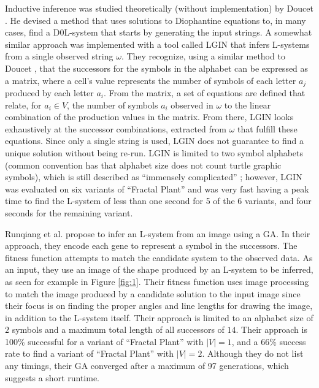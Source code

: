 \documentclass{llncs}
\begin{document}
	Inductive inference was studied theoretically (without implementation) by Doucet \cite{doucet_algebra}. He devised a method that uses solutions to Diophantine equations to, in many cases, find a D0L-system that starts by generating the input strings. A somewhat similar approach was implemented with a tool called LGIN \cite{nakano_inferD0Lerrorfree} that infers L-systems from a single observed string $\omega$. They recognize, using a similar method to Doucet \cite{doucet_algebra}, that the successors for the symbols in the alphabet can be expressed as a matrix, where a cell's value represents the number of symbols of each letter $a_{j}$ produced by each letter $a_{i}$. From the matrix, a set of equations are defined that relate, for $a_{i} \in V$, the number of symbols $a_{i}$ observed in $\omega$ to the linear combination of the production values in the matrix. From there, LGIN looks exhaustively at the successor combinations, extracted from $\omega$ that fulfill these equations. Since only a single string is used, LGIN does not guarantee to find a unique solution without being re-run. LGIN is limited to two symbol alphabets (common convention has that alphabet size does not count turtle graphic symbols), which is still described as ``immensely complicated'' \cite{nakano_inferD0Lerrorfree}; however, LGIN was evaluated on six variants of ``Fractal Plant'' \cite{beauty} and was very fast having a peak time to find the L-system of less than one second for 5 of the 6 variants, and four seconds for the remaining variant.
	
	Runqiang et al. \cite{runqiang_inferGA} propose to infer an L-system from an image using a GA. In their approach, they encode each gene to represent a symbol in the successors. The fitness function attempts to match the candidate system to the observed data. As an input, they use an image of the shape produced by an L-system to be inferred, as seen for example in Figure \ref{fig:1}. Their fitness function uses image processing to match the image produced by a candidate solution to the input image since their focus is on finding the proper angles and line lengths for drawing the image, in addition to the L-system itself. Their approach is limited to an alphabet size of $2$ symbols and a maximum total length of all successors of $14$. Their approach is 100\% successful for a variant of ``Fractal Plant'' \cite{beauty} with $|V| = 1$, and a 66\% success rate to find a variant of ``Fractal Plant'' \cite{beauty} with $|V| = 2$. Although they do not list any timings, their GA converged after a maximum of 97 generations, which suggests a short runtime.
	
\end{document}
